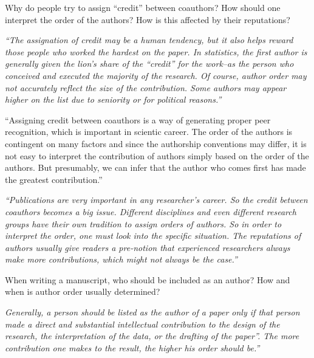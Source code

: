 \documentclass[portrait,11pt]{seminar}
\begin{document}
\es \bs Why do people try to assign ``credit'' between coauthors? How should one interpret the order of the authors? How is this affected by their reputations? 


{\it ``The assignation of credit may be a human tendency, but it also helps reward those people who worked the hardest on the paper. In statistics, the first author is generally given the lion’s share of the “credit” for the work–as the person who conceived and executed the majority of the research. Of course, author order may not accurately reflect the size of the contribution. Some authors may appear higher on the list due to seniority or for political reasons.''} 




\es
\bs
\it

``Assigning credit between coauthors is a way of generating proper peer recognition,
which is important in scientic career. The order of the authors is contingent on many
factors and since the authorship conventions may differ, it is not easy to interpret the
contribution of authors simply based on the order of the authors. But presumably,
we can infer that the author who comes first has made the greatest contribution.''


\es \bs 

\it
``Publications are very important in any researcher's career. So the credit between
coauthors becomes a big issue. Different disciplines and even different research groups
have their own tradition to assign orders of authors. So in order to interpret the
order, one must look into the specific situation. The reputations of authors usually
give readers a pre-notion that experienced researchers always make more contributions,
which might not always be the case.''

\es
\bs


When writing a manuscript, who should be included as an author? How and when is author order usually determined? 


{\it  Generally, a person should be listed as the author of a paper only if that person made a direct and substantial intellectual contribution to the design of the research, the interpretation of the data, or the drafting of the paper''. The more contribution one makes to the result, the higher his order should be.''}
\end{document}
